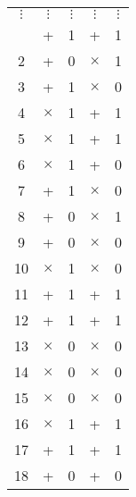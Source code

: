 \begin{longtable}{c|cc|cc}
    \endhead %
    $\vdots$ & $\vdots$                 & $\vdots$                & $\vdots$ & $\vdots$ \\
    \endfoot %
    \endlastfoot
    1      & +                          & 1                       & +        & 1   \\
    2      & +                          & 0                       & $\times$ & 1   \\
    3      & +                          & 1                       & $\times$ & 0   \\
    4      & $\times$                   & 1                       & +        & 1   \\
    5      & $\times$                   & 1                       & +        & 1   \\
    6      & $\times$                   & 1                       & +        & 0   \\
    7      & +                          & 1                       & $\times$ & 0   \\
    8      & +                          & 0                       & $\times$ & 1   \\
    9      & +                          & 0                       & $\times$ & 0   \\
    10     & $\times$                   & 1                       & $\times$ & 0   \\
    11     & +                          & 1                       & +        & 1   \\
    12     & +                          & 1                       & +        & 1   \\
    13     & $\times$                   & 0                       & $\times$ & 0   \\
    14     & $\times$                   & 0                       & $\times$ & 0   \\
    15     & $\times$                   & 0                       & $\times$ & 0   \\
    16     & $\times$                   & 1                       & +        & 1   \\
    17     & +                          & 1                       & +        & 1   \\
    18     & +                          & 0                       & +        & 0   \\

\end{longtable}
